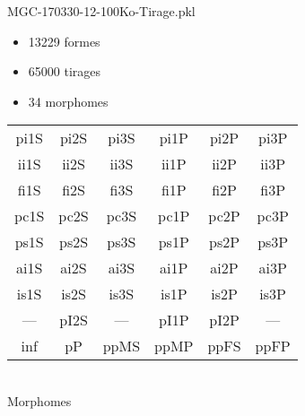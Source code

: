 MGC-170330-12-100Ko-Tirage.pkl
\begin{itemize}
\item 13229 formes
\item 65000 tirages
\item 34 morphomes
\end{itemize}
\begin{center}
\begin{tabular}{cccccc}
\hline
\cellcolor{white}pi1S & \cellcolor{orange}pi2S & \cellcolor{orange}pi3S & \cellcolor{white}pi1P & \cellcolor{white}pi2P & \cellcolor{white}pi3P\\
\cellcolor{brown}ii1S & \cellcolor{brown}ii2S & \cellcolor{brown}ii3S & \cellcolor{white}ii1P & \cellcolor{white}ii2P & \cellcolor{brown}ii3P\\
\cellcolor{yellow}fi1S & \cellcolor{lime}fi2S & \cellcolor{lime}fi3S & \cellcolor{green}fi1P & \cellcolor{white}fi2P & \cellcolor{green}fi3P\\
\cellcolor{yellow}pc1S & \cellcolor{yellow}pc2S & \cellcolor{yellow}pc3S & \cellcolor{white}pc1P & \cellcolor{white}pc2P & \cellcolor{yellow}pc3P\\
\cellcolor{teal}ps1S & \cellcolor{white}ps2S & \cellcolor{teal}ps3S & \cellcolor{white}ps1P & \cellcolor{white}ps2P & \cellcolor{teal}ps3P\\
\cellcolor{white}ai1S & \cellcolor{lightgray}ai2S & \cellcolor{lightgray}ai3S & \cellcolor{white}ai1P & \cellcolor{blue}ai2P & \cellcolor{white}ai3P\\
\cellcolor{pink}is1S & \cellcolor{white}is2S & \cellcolor{lightgray}is3S & \cellcolor{white}is1P & \cellcolor{black}is2P & \cellcolor{pink}is3P\\
--- & \cellcolor{white}pI2S & --- & \cellcolor{white}pI1P & \cellcolor{blue}pI2P & ---\\
\cellcolor{white}inf & \cellcolor{white}pP & \cellcolor{white}ppMS & \cellcolor{white}ppMP & \cellcolor{white}ppFS & \cellcolor{white}ppFP\\
\hline
\end{tabular}\\
Morphomes
\end{center}
\bigskip


